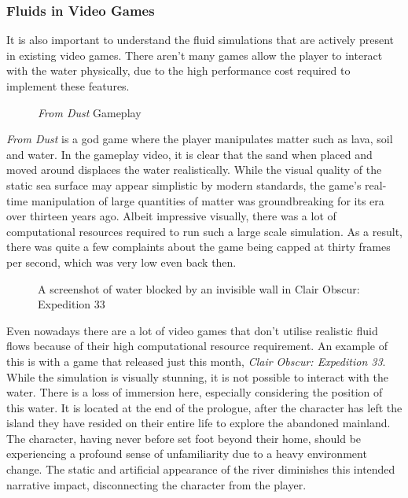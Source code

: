 \documentclass[12pt]{article}
\newcommand{\wideimage}[2][]{%
  \makebox[\textwidth][c]{\texttt{[image: \#2]}}%
}
\begin{document}
    \subsubsection{Fluids in Video Games}

    It is also important to understand the fluid simulations that are actively present in existing video games. There aren't many games allow the player to interact with the water physically, due to the high performance cost required to implement these features.

    \begin{figure}[H]
        \wideimage[]{fromDust.png}
        \caption{\textit{From Dust} Gameplay \cite{fromdustvideo}}
    \end{figure}

    \textit{From Dust}\cite{fromdust} is a god game where the player manipulates matter such as lava, soil and water. In the gameplay video\cite{fromdustvideo}, it is clear that the sand when placed and moved around displaces the water realistically. While the visual quality of the static sea surface may appear simplistic by modern standards, the game's real-time manipulation of large quantities of matter was groundbreaking for its era over thirteen years ago. Albeit impressive visually, there was a lot of computational resources required to run such a large scale simulation. As a result, there was quite a few complaints about the game being capped at thirty frames per second\cite{dsog}, which was very low even back then.
    
    \begin{figure}[H]
        \wideimage[]{clairObscur.png}
        \caption{A screenshot of water blocked by an invisible wall in Clair Obscur: Expedition 33}
    \end{figure}

    Even nowadays there are a lot of video games that don't utilise realistic fluid flows because of their high computational resource requirement. An example of this is with a game that released just this month, \textit{Clair Obscur: Expedition 33}\cite{clairobscur}.
    While the simulation is visually stunning, it is not possible to interact with the water. There is a loss of immersion here, especially considering the position of this water. It is located at the end of the prologue, after the character has left the island they have resided on their entire life to explore the abandoned mainland. The character, having never before set foot beyond their home, should be experiencing a profound sense of unfamiliarity due to a heavy environment change. The static and artificial appearance of the river diminishes this intended narrative impact, disconnecting the character from the player.
\end{document}
